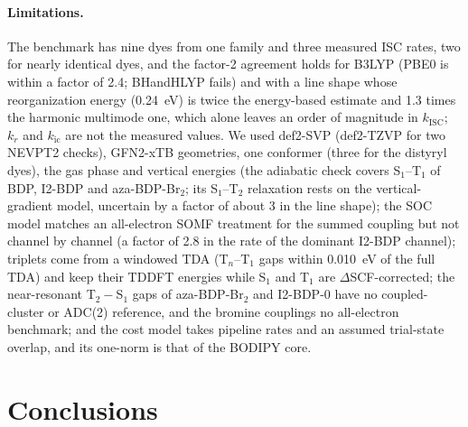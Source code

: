 \documentclass[journal=jctcce,manuscript=article]{achemso}
\newcommand{\kisc}{k_\mathrm{ISC}}
\begin{document}
\paragraph{Limitations.} The benchmark has nine dyes from one family and three measured ISC rates, two
for nearly identical dyes, and the factor-2 agreement holds for B3LYP (PBE0 is within a factor of 2.4; BHandHLYP fails) and with a line shape whose
reorganization energy (0.24~eV) is twice the energy-based estimate and 1.3 times the harmonic multimode one, which
alone leaves an order of magnitude in $\kisc$; $k_r$ and $k_\mathrm{ic}$ are not the measured values. We used def2-SVP (def2-TZVP for two NEVPT2 checks), GFN2-xTB
geometries, one conformer (three for the distyryl dyes), the gas phase and vertical energies (the adiabatic check covers S$_1$--T$_1$ of BDP, I2-BDP and
aza-BDP-Br$_2$; its S$_1$--T$_2$ relaxation rests on the vertical-gradient model, uncertain by a factor of about 3 in the
line shape); the SOC model matches an all-electron SOMF treatment for the summed coupling but not channel by
channel (a factor of 2.8 in the rate of the dominant I2-BDP channel); triplets come from a windowed TDA
(T$_n$--T$_1$ gaps within 0.010~eV of the full TDA) and keep their TDDFT energies while S$_1$ and T$_1$ are $\Delta$SCF-corrected; the near-resonant T$_2-$S$_1$ gaps of aza-BDP-Br$_2$ and I2-BDP-0 have no
coupled-cluster or ADC(2) reference, and the bromine couplings no all-electron benchmark; and the
cost model takes pipeline rates and an assumed trial-state overlap, and its one-norm is that of the BODIPY
core.

\section{Conclusions}
\end{document}

